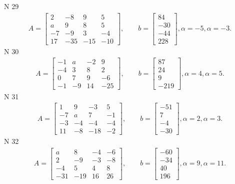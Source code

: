 \documentclass[11pt]{report}
\begin{document}
N 29
\begin{align*}
 A = \left[\begin{matrix}2 & -8 & 9 & 5\\a & 9 & 8 & 5\\-7 & -9 & 3 & -4\\17 & -35 & -15 & -10\end{matrix}\right],
    \qquad b = \left[\begin{matrix}84\\-30\\-44\\228\end{matrix}\right], \alpha = -5, \alpha = -3. 
 \end{align*}
N 30
\begin{align*}
 A = \left[\begin{matrix}-1 & a & -2 & 9\\-4 & 3 & 8 & 2\\0 & 7 & 9 & -6\\-1 & -9 & 14 & -25\end{matrix}\right],
    \qquad b = \left[\begin{matrix}87\\24\\9\\-219\end{matrix}\right], \alpha = 4, \alpha = 5. 
 \end{align*}
N 31
\begin{align*}
 A = \left[\begin{matrix}1 & 9 & -3 & 5\\-7 & a & 7 & -1\\-3 & -4 & -4 & -4\\11 & -8 & -18 & -2\end{matrix}\right],
    \qquad b = \left[\begin{matrix}-51\\7\\-4\\-30\end{matrix}\right], \alpha = 2, \alpha = 3. 
 \end{align*}
N 32
\begin{align*}
 A = \left[\begin{matrix}a & 8 & -4 & -6\\2 & -9 & -3 & -8\\-4 & 5 & 4 & 8\\-31 & -19 & 16 & 26\end{matrix}\right],
    \qquad b = \left[\begin{matrix}-60\\-34\\40\\196\end{matrix}\right], \alpha = 9, \alpha = 11. 
 \end{align*}
\end{document}
